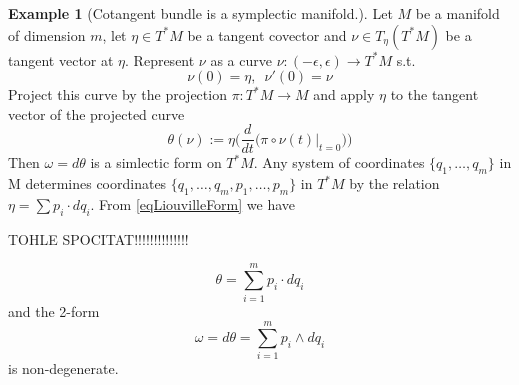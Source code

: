 \documentclass{article}
\theoremstyle{definition}
\newtheorem{example}[theorem]{Example}
\begin{document}
\begin{example}[Cotangent bundle is a symplectic manifold.]
    Let $M$ be a manifold of dimension $m$, let $\eta \in T^*M$ be a tangent covector and $\nu \in T_\eta(T^*M)$ be a tangent vector at $\eta$. Represent $\nu$ as a curve $\nu:(-\epsilon, \epsilon) \rightarrow T^*M$ s.t. 
    \begin{equation*}
        \nu(0) = \eta,\,\,\, \nu'(0) = \nu
    \end{equation*}
    Project this curve by the projection $\pi:T^*M \rightarrow M$ and apply $\eta$ to the tangent vector of the projected curve 
    \begin{equation}\label{eqLiouvilleForm}
        \theta(\nu) := \eta \Big(\frac{d}{dt}\big(\pi \circ \nu(t)\vert_{t=0} \big)\Big)
    \end{equation}
    Then $\omega = d \theta$ is a simlectic form on $T^*M$. Any system of coordinates $\{q_1,\dots, q_m\}$ in M determines coordinates $\{q_1,\dots, q_m, p_1, \dots, p_m\}$ in $T^*M$ by the relation $\eta = \sum p_i \cdot dq_i$. From \eqref{eqLiouvilleForm} we have 
    
    
    TOHLE SPOCITAT!!!!!!!!!!!!!!
    
    \begin{equation*}
        \theta = \sum_{i=1}^m p_i \cdot dq_i
    \end{equation*}
    and the 2-form
    \begin{equation*}
        \omega = d \theta = \sum_{i=1}^m p_i \wedge dq_i
    \end{equation*}
    is non-degenerate.
\end{example}
\end{document}
